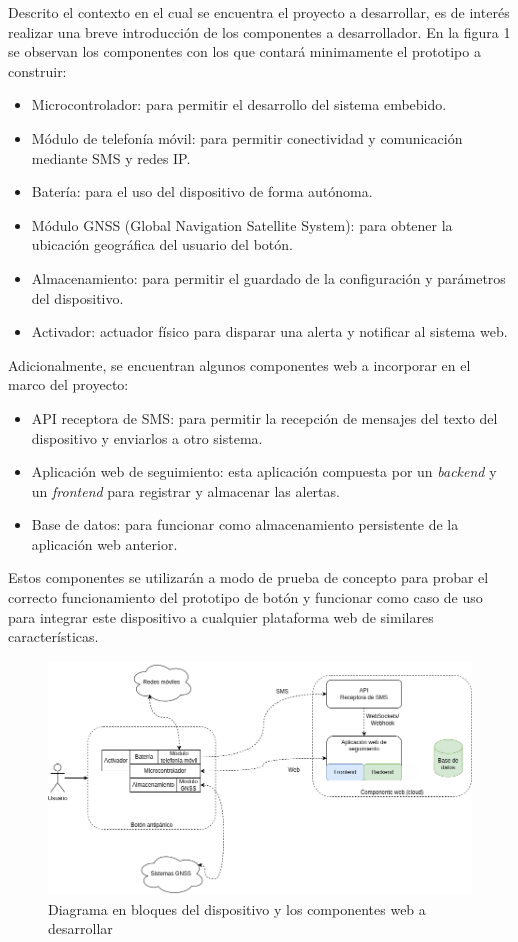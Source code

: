 \documentclass[
11pt, %
]{charter}
\begin{document}
Descrito el contexto en el cual se encuentra el proyecto a desarrollar, es de interés realizar una breve introducción de los componentes a desarrollador. En la figura 1 se observan los componentes con los que contará minimamente el prototipo a construir:
\begin{itemize}
	\item Microcontrolador: para permitir el desarrollo del sistema embebido.
	\item Módulo de telefonía móvil: para permitir conectividad y comunicación mediante SMS y redes IP.
	\item Batería: para el uso del dispositivo de forma autónoma.
	\item Módulo GNSS (Global Navigation Satellite System): para obtener la ubicación geográfica del usuario del botón.
	\item Almacenamiento: para permitir el guardado de la configuración y parámetros del dispositivo.
	\item Activador: actuador físico para disparar una alerta y notificar al sistema web.
\end{itemize}

Adicionalmente, se encuentran algunos componentes web a incorporar en el marco del proyecto:

\begin{itemize}
	\item API receptora de SMS: para permitir la recepción de mensajes del texto del dispositivo y enviarlos a otro sistema.
	\item Aplicación web de seguimiento: esta aplicación compuesta por un \textit{backend} y un \textit{frontend} para registrar y almacenar las alertas.
	\item Base de datos: para funcionar como almacenamiento persistente de la aplicación web anterior.
\end{itemize}

Estos componentes se utilizarán a modo de prueba de concepto para probar el correcto funcionamiento del prototipo de botón y funcionar como caso de uso para integrar este dispositivo a cualquier plataforma web de similares características.

\begin{figure}[htpb]
\centering 
\includegraphics[width=1\textwidth]{./Figuras/diagBloques.png}
\caption{Diagrama en bloques del dispositivo y los componentes web a desarrollar}
\label{fig:diagBloques}
\end{figure}
\end{document}
